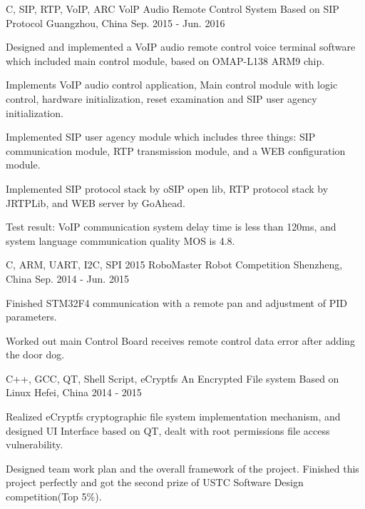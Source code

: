 \begin{cventries}
  \cventry
    {C, SIP, RTP, VoIP, ARC} %
    {VolP Audio Remote Control System Based on SIP Protocol} %
    {Guangzhou, China} %
    {Sep. 2015 - Jun. 2016}%
    {
      \begin{cvitems} %
        \item  {Designed and implemented a VoIP audio remote control voice terminal software which included main control module, based on OMAP-L138 ARM9 chip.}
        \item {Implements VoIP audio control application, Main control module with logic control, hardware initialization, reset examination and SIP user agency initialization.}
        \item  {Implemented SIP user agency module which includes three things: SIP communication module, RTP transmission module, and a WEB configuration module.}
        \item {Implemented SIP protocol stack by oSIP open lib, RTP protocol stack by JRTPLib, and WEB server by GoAhead.}
        \item {Test result: VoIP communication system delay time is less than 120ms, and system language communication quality MOS is 4.8.}
      \end{cvitems}
    }

  \cventry
    {C, ARM, UART, I2C, SPI} %
    {2015 RoboMaster Robot Competition} %
    {Shenzheng, China} %
    {Sep. 2014 - Jun. 2015}%
    {
      \begin{cvitems} %
        \item  {Finished STM32F4 communication with a remote pan and adjustment of PID parameters.}
        \item {Worked out main Control Board receives remote control data error after adding the door dog.}
      \end{cvitems}
    }

  \cventry
    {C++, GCC, QT, Shell Script, eCryptfs} %
    {An Encrypted File system Based on Linux} %
    {Hefei, China} %
    {2014 - 2015}%
    {
      \begin{cvitems} %
        \item  {Realized eCryptfs cryptographic file system implementation mechanism, and designed UI Interface based on QT, dealt with root permissions file access vulnerability.}
        \item  {Designed team work plan and the overall framework of the project. Finished this project perfectly and got the second prize of USTC Software Design competition(Top 5\%).}
      \end{cvitems}
    }


\end{cventries}
